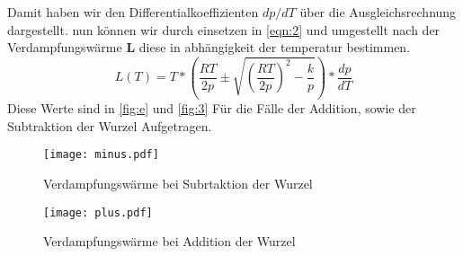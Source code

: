Damit haben wir den Differentialkoeffizienten $dp/dT$ über die Ausgleichsrechnung dargestellt. 
nun können wir durch einsetzen in \autoref{eqn:2} und umgestellt nach der Verdampfungswärme $\symbf{L}$
diese in abhängigkeit der temperatur bestimmen.
\begin{equation}
L(T) = T * \left(\frac{RT}{2p}\pm\sqrt{\left(\frac{RT}{2p}\right)^2-\frac{k}{p}}\right) * \frac{dp}{dT}
\end{equation}
Diese Werte sind in \autoref{fig:e} und \autoref{fig:3} 
Für die Fälle der Addition, sowie der Subtraktion der 
Wurzel Aufgetragen.

\begin{figure}[H]
  \centering
  \texttt{[image: minus.pdf]}
  \label{fig:e}
  \caption{Verdampfungswärme bei Subrtaktion der Wurzel}
\end{figure}

\begin{figure}[H]
  \centering
  \texttt{[image: plus.pdf]}
  \label{fig:3}
  \caption{Verdampfungswärme bei Addition der Wurzel}
\end{figure}



